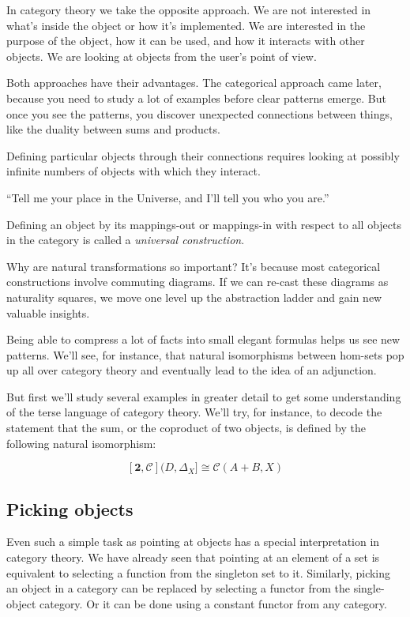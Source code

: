 \documentclass[DaoFP]{subfiles}
\begin{document}
In category theory we take the opposite approach. We are not interested in what's inside the object or how it's implemented. We are interested in the purpose of the object, how it can be used, and how it interacts with other objects. We are looking at objects from the user's point of view.

Both approaches have their advantages. The categorical approach came later, because you need to study a lot of examples before clear patterns emerge. But once you see the patterns, you discover unexpected connections between things, like the duality between sums and products.

Defining particular objects through their connections requires looking at possibly infinite numbers of objects with which they interact. 

``Tell me your place in the Universe, and I'll tell you who you are.''

Defining an object by its mappings-out or mappings-in with respect to all objects in the category is called a \emph{universal construction}. 

Why are natural transformations so important? It's because most categorical constructions involve commuting diagrams. If we can re-cast these diagrams as naturality squares, we move one level up the abstraction ladder and gain new valuable insights.

Being able to compress a lot of facts into small elegant formulas helps us see new patterns. We'll see, for instance, that natural isomorphisms between hom-sets pop up all over category theory and eventually lead to the idea of an adjunction.

But first we'll study several examples in greater detail to get some understanding of the terse language of category theory. We'll try, for instance, to decode the statement that the sum, or the coproduct of two objects, is defined by the following natural isomorphism:

\[ [\mathbf{2}, \mathcal{C}](D, \Delta_X]  \cong \mathcal{C}(A + B, X) \]



\subsection{Picking objects}

Even such a simple task as pointing at objects has a special interpretation in category theory. We have already seen that pointing at an element of a set is equivalent to selecting a function from the singleton set to it. Similarly, picking an object in a category can be replaced by selecting a functor from the single-object category. Or it can be done using a constant functor from any category. 
\end{document}
